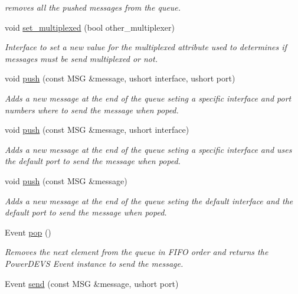 \begin{DoxyCompactItemize}
\begin{DoxyCompactList}\small\item\em removes all the pushed messages from the queue. \end{DoxyCompactList}\item 
void \hyperlink{classmessage_1_1queue_ae84717161f68aa5fee8b158afe7e9a75}{set\+\_\+multiplexed} (bool other\+\_\+multiplexer)
\begin{DoxyCompactList}\small\item\em Interface to set a new value for the multiplexed attribute used to determines if messages must be send multiplexed or not. \end{DoxyCompactList}\item 
void \hyperlink{classmessage_1_1queue_a473ab65bba7f707e59710b22343a62bf}{push} (const M\+SG \&message, ushort interface, ushort port)
\begin{DoxyCompactList}\small\item\em Adds a new message at the end of the queue seting a specific interface and port numbers where to send the message when poped. \end{DoxyCompactList}\item 
void \hyperlink{classmessage_1_1queue_a961d33eeb52a8733669c74c18289e6bb}{push} (const M\+SG \&message, ushort interface)
\begin{DoxyCompactList}\small\item\em Adds a new message at the end of the queue seting a specific interface and uses the default port to send the message when poped. \end{DoxyCompactList}\item 
void \hyperlink{classmessage_1_1queue_a295edb53a69103cd3c6607cf40546c20}{push} (const M\+SG \&message)
\begin{DoxyCompactList}\small\item\em Adds a new message at the end of the queue seting the default interface and the default port to send the message when poped. \end{DoxyCompactList}\item 
Event \hyperlink{classmessage_1_1queue_a8ebd25ce589eca4dd4b1afde687df705}{pop} ()
\begin{DoxyCompactList}\small\item\em Removes the next element from the queue in F\+I\+FO order and returns the Power\+D\+E\+VS Event instance to send the message. \end{DoxyCompactList}\item 
Event \hyperlink{classmessage_1_1queue_a5fb6a671faf783c7bd13caa69451ca84}{send} (const M\+SG \&message, ushort port)

\end{DoxyCompactItemize}
